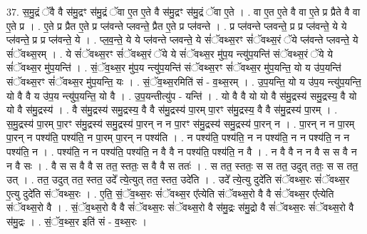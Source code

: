 \documentclass[17pt]{extarticle}
\begin{document}
37. स॒मु॒द्रं ॅवै वै स॑मु॒द्रꣳ स॑मु॒द्रं ॅवा ए॒त ए॒ते वै स॑मु॒द्रꣳ स॑मु॒द्रं ॅवा ए॒ते । . वा ए॒त ए॒ते वै वा ए॒ते प्र प्रैते वै वा ए॒ते प्र । . ए॒ते प्र प्रैत ए॒ते प्र प्ल॑वन्ते प्लवन्ते॒ प्रैत ए॒ते प्र प्ल॑वन्ते । . प्र प्ल॑वन्ते प्लवन्ते॒ प्र प्र प्ल॑वन्ते॒ ये ये प्ल॑वन्ते॒ प्र प्र प्ल॑वन्ते॒ ये । . प्ल॒व॒न्ते॒ ये ये प्ल॑वन्ते प्लवन्ते॒ ये सं॑ॅवथ्स॒रꣳ सं॑ॅवथ्स॒रं ॅये प्ल॑वन्ते प्लवन्ते॒ ये सं॑ॅवथ्स॒रम् । . ये सं॑ॅवथ्स॒रꣳ सं॑ॅवथ्स॒रं ॅये ये सं॑ॅवथ्स॒र मु॑प॒य न्त्यु॑प॒यन्ति॑ संॅवथ्स॒रं ॅये ये सं॑ॅवथ्स॒र मु॑प॒यन्ति॑ । . सं॒ॅव॒थ्स॒र मु॑प॒य न्त्यु॑प॒यन्ति॑ संॅवथ्स॒रꣳ सं॑ॅवथ्स॒र मु॑प॒यन्ति॒ यो य उ॑प॒यन्ति॑ संॅवथ्स॒रꣳ सं॑ॅवथ्स॒र मु॑प॒यन्ति॒ यः । . सं॒ॅव॒थ्स॒रमिति॑ सं - व॒थ्स॒रम् । . उ॒प॒यन्ति॒ यो य उ॑प॒य न्त्यु॑प॒यन्ति॒ यो वै वै य उ॑प॒य न्त्यु॑प॒यन्ति॒ यो वै । . उ॒प॒यन्तीत्यु॑प - यन्ति॑ । . यो वै वै यो यो वै स॑मु॒द्रस्य॑ समु॒द्रस्य॒ वै यो यो वै स॑मु॒द्रस्य॑ । . वै स॑मु॒द्रस्य॑ समु॒द्रस्य॒ वै वै स॑मु॒द्रस्य॑ पा॒रम् पा॒रꣳ स॑मु॒द्रस्य॒ वै वै स॑मु॒द्रस्य॑ पा॒रम् । . स॒मु॒द्रस्य॑ पा॒रम् पा॒रꣳ स॑मु॒द्रस्य॑ समु॒द्रस्य॑ पा॒रन् न न पा॒रꣳ स॑मु॒द्रस्य॑ समु॒द्रस्य॑ पा॒रन् न । . पा॒रन् न न पा॒रम् पा॒रन् न पश्य॑ति॒ पश्य॑ति॒ न पा॒रम् पा॒रन् न पश्य॑ति । . न पश्य॑ति॒ पश्य॑ति॒ न न पश्य॑ति॒ न न पश्य॑ति॒ न न पश्य॑ति॒ न । . पश्य॑ति॒ न न पश्य॑ति॒ पश्य॑ति॒ न वै वै न पश्य॑ति॒ पश्य॑ति॒ न वै । . न वै वै न न वै स स वै न न वै सः । . वै स स वै वै स तत॒ स्ततः॒ स वै वै स ततः॑ । . स तत॒ स्ततः॒ स स तत॒ उदुत् ततः॒ स स तत॒ उत् । . तत॒ उदुत् तत॒ स्तत॒ उदे᳚ त्ये॒त्युत् तत॒ स्तत॒ उदे॑ति । . उदे᳚ त्ये॒त्यु दुदे॑ति संॅवथ्स॒रः सं॑ॅवथ्स॒र ए॒त्यु दुदे॑ति संॅवथ्स॒रः । . ए॒ति॒ सं॒ॅव॒थ्स॒रः सं॑ॅवथ्स॒र ए᳚त्येति संॅवथ्स॒रो वै वै सं॑ॅवथ्स॒र ए᳚त्येति संॅवथ्स॒रो वै । . सं॒ॅव॒थ्स॒रो वै वै सं॑ॅवथ्स॒रः सं॑ॅवथ्स॒रो वै स॑मु॒द्रः स॑मु॒द्रो वै सं॑ॅवथ्स॒रः सं॑ॅवथ्स॒रो वै स॑मु॒द्रः । . सं॒ॅव॒थ्स॒र इति॑ सं - व॒थ्स॒रः । \newline
\pagebreak
{}
\end{document}
